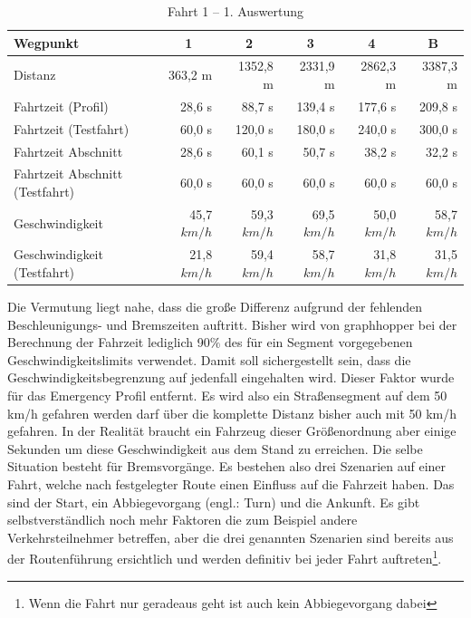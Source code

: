 \begin{table}[htb]
\centering
\footnotesize
\caption{Fahrt 1 -- 1. Auswertung}
\label{tab:driveinit}
\begin{tabular}{|l|r|r|r|r|r|}
\hline
Wegpunkt                               & \multicolumn{1}{c|}{1} & \multicolumn{1}{c|}{2} & \multicolumn{1}{c|}{3} & \multicolumn{1}{c|}{4} & \multicolumn{1}{c|}{B}  \\ \hline
Distanz                                & 363,2 m                & 1352,8 m               & 2331,9 m               & 2862,3 m               & 3387,3 m               \\ \hline
Fahrtzeit (Profil)                     & 28,6 s                 & 88,7 s                 & 139,4 s                & 177,6 s                & 209,8 s                \\ \hline
Fahrtzeit (Testfahrt)                  & 60,0 s                 & 120,0 s                & 180,0 s                & 240,0 s                & 300,0 s                \\ \hline
Fahrtzeit Abschnitt                    & 28,6 s                 & 60,1 s                 & 50,7 s                 & 38,2 s                 & 32,2 s                 \\ \hline
Fahrtzeit Abschnitt (Testfahrt)        & 60,0 s                 & 60,0 s                 & 60,0 s                 & 60,0 s                 & 60,0 s                 \\ \hline
Geschwindigkeit                        & 45,7 $km/h$            & 59,3 $km/h$            & 69,5 $km/h$            & 50,0 $km/h$            & 58,7 $km/h$            \\ \hline
Geschwindigkeit (Testfahrt)            & 21,8 $km/h$            & 59,4 $km/h$            & 58,7 $km/h$            & 31,8 $km/h$            & 31,5 $km/h$            \\ \hline
\end{tabular}
\end{table}

Die Vermutung liegt nahe, dass die große Differenz aufgrund der fehlenden Beschleunigungs- und Bremszeiten auftritt.
Bisher wird von graphhopper bei der Berechnung der Fahrzeit lediglich 90$\%$ des für ein Segment vorgegebenen Geschwindigkeitslimits verwendet.
Damit soll sichergestellt sein, dass die Geschwindigkeitsbegrenzung auf jedenfall eingehalten wird.
Dieser Faktor wurde für das Emergency Profil entfernt.
Es wird also ein Straßensegment auf dem 50 km/h gefahren werden darf über die komplette Distanz bisher auch mit 50 km/h gefahren.
In der Realität braucht ein Fahrzeug dieser Größenordnung aber einige Sekunden um diese Geschwindigkeit aus dem Stand zu erreichen.
Die selbe Situation besteht für Bremsvorgänge.
Es bestehen also drei Szenarien auf einer Fahrt, welche nach festgelegter Route einen Einfluss auf die Fahrzeit haben.
Das sind der Start, ein Abbiegevorgang (engl.: Turn) und die Ankunft.
Es gibt selbstverständlich noch mehr Faktoren die zum Beispiel andere Verkehrsteilnehmer betreffen, aber die drei genannten Szenarien sind bereits aus der Routenführung ersichtlich und werden definitiv bei jeder Fahrt auftreten\footnote{Wenn die Fahrt nur geradeaus geht ist auch kein Abbiegevorgang dabei}.

